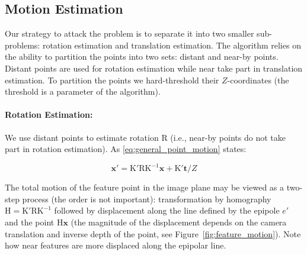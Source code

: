 \documentclass[runningheads]{llncs}
\begin{document}
\subsection{Motion Estimation}

Our strategy to attack the problem is to separate it into two smaller
sub-problems: rotation estimation and translation estimation. The
algorithm relies on the ability to partition the points into two sets:
distant and near-by points.  Distant points are used for rotation
estimation while near take part in translation estimation.  To
partition the points we hard-threshold their $Z$-coordinates (the
threshold is a parameter of the algorithm).

\paragraph{Rotation Estimation:} We use distant points to estimate
rotation $\mathrm{R}$ (i.e., near-by points do not take part in rotation
estimation). As \ref{eq:general_point_motion} states:

\begin{equation}
  \mathbf{x}' = \mathrm{K'RK^{-1}}\mathbf{x} + \mathrm{K'}\mathbf{t}/Z
\end{equation}

The total motion of the feature point in the image plane may be viewed
as a two-step process (the order is not important): transformation by
homography $\mathrm{H} = \mathrm{K'RK^{-1}}$ followed by displacement
along the line defined by the epipole $e'$ and the point
$\mathrm{H}\mathbf{x}$ (the magnitude of the displacement depends on
the camera translation and inverse depth of the point, see
Figure~\ref{fig:feature_motion}). Note how near features are more
displaced along the epipolar line.
\end{document}
